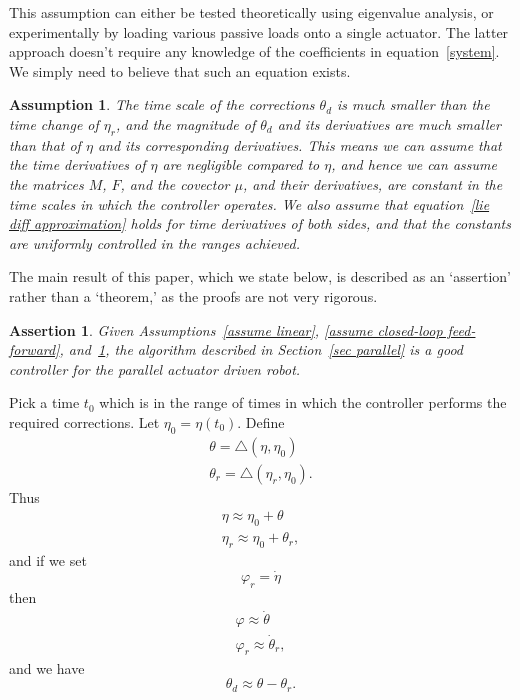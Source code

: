 \documentclass[reqno,twocolumn]{amsart}
\newcommand{\liediff}{\mathbin{\triangle}}
\newtheorem{assertion}{Assertion}
\newtheorem{assumption}{Assumption}
\renewcommand{\mathsf}{}
\begin{document}
This assumption can either be tested theoretically using eigenvalue analysis, or experimentally by loading various passive loads onto a single actuator.  The latter approach doesn't require any knowledge of the coefficients in equation~\eqref{system}.  We simply need to believe that such an equation exists.

\begin{assumption} \label{time scale} The time scale of the corrections $\theta_d$ is much smaller than the time change of $\eta_r$, and the magnitude of $\theta_d$ and its derivatives are much smaller than that of $\eta$ and its corresponding derivatives.  This means we can assume that the time derivatives of $\eta$ are negligible compared to $\eta$, and hence we can assume the matrices $\mathsf M$, $\mathsf F$, and the covector $\mu$, and their derivatives, are constant in the time scales in which the controller operates.  We also assume that equation~\eqref{lie diff approximation} holds for time derivatives of both sides, and that the constants are uniformly controlled in the ranges achieved.
\end{assumption}

The main result of this paper, which we state below, is described as an `assertion' rather than a `theorem,' as the proofs are not very rigorous.

\begin{assertion}
\label{main}
Given Assumptions~\ref{assume linear}, \ref{assume closed-loop feed-forward}, and~\ref{time scale}, the algorithm described in Section~\ref{sec parallel} is a good controller for the parallel actuator driven robot.
\end{assertion}

Pick a time $t_0$ which is in the range of times in which the controller performs the required corrections.  Let $\eta_0 = \eta(t_0)$.  Define
\begin{gather}
\theta = \liediff(\eta, \eta_0) \\
\theta_r = \liediff(\eta_r, \eta_0) .
\end{gather}
Thus
\begin{gather}
\label{approx eta}
\eta \approx \eta_0 + \theta \\
\label{approx eta r}
\eta_r \approx \eta_0 + \theta_r ,
\end{gather}
and if we set
\begin{equation}
\varphi_r = \dot \eta
\end{equation}
then
\begin{gather}
\label{varphi}
\varphi \approx \dot \theta \\
\label{varphi_r}
\varphi_r \approx \dot \theta_r ,
\end{gather}
and we have
\begin{equation}
\label{theta d theta theta r}
\theta_d \approx \theta - \theta_r.
\end{equation}
\end{document}

